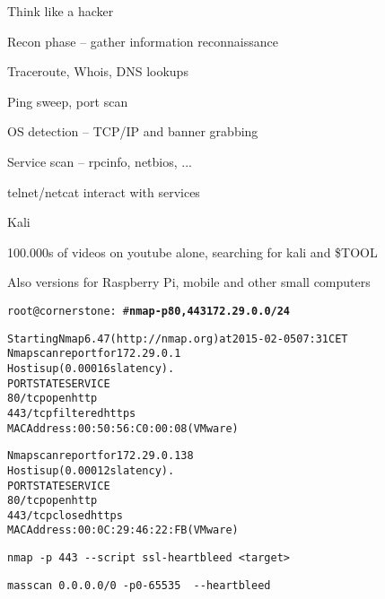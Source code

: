 \documentclass[20pt,landscape,a4paper,footrule]{foils}
\begin{document}

\begin{list1}
\item Think like a hacker
\item Recon phase -- gather information reconnaissance
\begin{list2}
\item Traceroute, Whois, DNS lookups
\item Ping sweep, port scan
\item OS detection -- TCP/IP and banner grabbing
\item Service scan -- rpcinfo, netbios, ...
\item telnet/netcat interact with services
\end{list2}
\end{list1}



\begin{list1}
\item  Kali 
\item 100.000s of videos on youtube alone, searching for kali and \$TOOL
\item Also versions for Raspberry Pi, mobile and other small computers
\end{list1}



\begin{alltt}\small
root@cornerstone:~#{\bfseries  nmap -p80,443 172.29.0.0/24}

Starting Nmap 6.47 ( http://nmap.org ) at 2015-02-05 07:31 CET
Nmap scan report for 172.29.0.1
Host is up (0.00016s latency).
PORT    STATE    SERVICE
{\color{darkgreen}80/tcp  open     http}
443/tcp filtered https
MAC Address: 00:50:56:C0:00:08 (VMware)

Nmap scan report for 172.29.0.138
Host is up (0.00012s latency).
PORT    STATE  SERVICE
{\color{darkgreen}80/tcp  open   http}
443/tcp closed https
MAC Address: 00:0C:29:46:22:FB (VMware)

\end{alltt}



\begin{list1}
\item \verb+nmap -p 443 --script ssl-heartbleed <target>+\\
\item \verb+masscan 0.0.0.0/0 -p0-65535  --heartbleed+\\
\end{list1}


\myquestionspage
\end{document}
